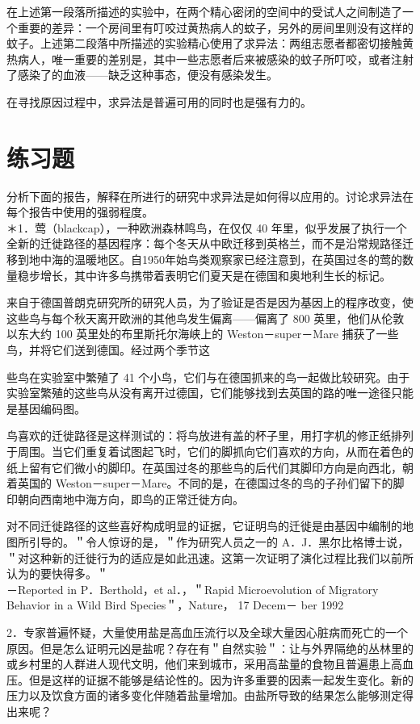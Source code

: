 在上述第一段落所描述的实验中，在两个精心密闭的空间中的受试人之间制造了一个重要的差异：一个房间里有叮咬过黄热病人的蚊子，另外的房间里则没有这样的蚊子。上述第二段落中所描述的实验精心使用了求异法：两组志愿者都密切接触黄热病人，唯一重要的差别是，其中一些志愿者后来被感染的蚊子所叮咬，或者注射了感染了的血液——缺乏这种事态，便没有感染发生。

在寻找原因过程中，求异法是普遍可用的同时也是强有力的。

\section*{练习题}
分析下面的报告，解释在所进行的研究中求异法是如何得以应用的。讨论求异法在每个报告中使用的强弱程度。\\
＊1．莺（blackcap），一种欧洲森林鸣鸟，在仅仅 40 年里，似乎发展了执行一个全新的迁徙路径的基因程序：每个冬天从中欧迁移到英格兰，而不是沿常规路径迁移到地中海的温暖地区。自1950年始鸟类观察家已经注意到，在英国过冬的莺的数量稳步增长，其中许多鸟携带着表明它们夏天是在德国和奥地利生长的标记。

来自于德国普朗克研究所的研究人员，为了验证是否是因为基因上的程序改变，使这些鸟与每个秋天离开欧洲的其他鸟发生偏离——偏离了 800 英里，他们从伦敦以东大约 100 英里处的布里斯托尔海峡上的 Weston－super－Mare 捕获了一些鸟，并将它们送到德国。经过两个季节这

些鸟在实验室中繁殖了 41 个小鸟，它们与在德国抓来的鸟一起做比较研究。由于实验室繁殖的这些鸟从没有离开过德国，它们能够找到去英国的路的唯一途径只能是基因编码图。

鸟喜欢的迁徙路径是这样测试的：将鸟放进有盖的杯子里，用打字机的修正纸排列于周围。当它们重复着试图起飞时，它们的脚抓向它们喜欢的方向，从而在着色的纸上留有它们微小的脚印。在英国过冬的那些鸟的后代们其脚印方向是向西北，朝着英国的 Weston－super－Mare。不同的是，在德国过冬的鸟的子孙们留下的脚印朝向西南地中海方向，即鸟的正常迁徙方向。

对不同迁徙路径的这些喜好构成明显的证据，它证明鸟的迁徙是由基因中编制的地图所引导的。＂令人惊讶的是，＂作为研究人员之一的 A．J．黑尔比格博士说，＂对这种新的迁徙行为的适应是如此迅速。这第一次证明了演化过程比我们以前所认为的要快得多。＂\\
－Reported in P．Berthold，et al．，＂Rapid Microevolution of Migratory Behavior in a Wild Bird Species＂，Nature， 17 Decem－ ber 1992

2．专家普遍怀疑，大量使用盐是高血压流行以及全球大量因心脏病而死亡的一个原因。但是怎么证明元凶是盐呢？存在有＂自然实验＂：让与外界隔绝的丛林里的或乡村里的人群进人现代文明，他们来到城市，采用高盐量的食物且普遍患上高血压。但是这样的证据不能够是结论性的。因为许多重要的因素一起发生变化。新的压力以及饮食方面的诸多变化伴随着盐量增加。由盐所导致的结果怎么能够测定得出来呢？


